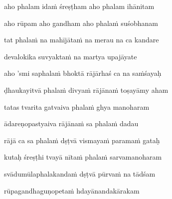 aho phalam idaṁ śreṣṭham aho phalam ihānitam\thinspace{\dandab} \dontdisplaylinenum

aho rūpam aho gandham aho phalaṁ suśobhanam \veg\dontdisplaylinenum
{}

tat phalaṁ na mahījātaṁ na merau na ca kandare\thinspace{\dandab} \dontdisplaylinenum

devalokika suvyaktaṁ na martya upajāyate \veg\dontdisplaylinenum
{}

aho 'smi saphalaṁ bhoktā rājārhaś ca na saṁśayaḥ\thinspace{\dandab} \dontdisplaylinenum

ḍhaukayitvā phalaṁ divyaṁ rājānaṁ toṣayāmy aham \veg\dontdisplaylinenum
{}

tatas tvarita gatvaiva phalaṁ ghya manoharam\thinspace{\dandab} \dontdisplaylinenum

ādareṇopastyaiva rājānaṁ sa phalaṁ dadau \veg\dontdisplaylinenum
{}

rājā ca sa phalaṁ dṣṭvā vismayaṁ paramaṁ gataḥ\thinspace{\dandab} \dontdisplaylinenum

kutaḥ śreṣṭhi tvayā nītaṁ phalaṁ sarvamanoharam \veg\dontdisplaylinenum
{}

svādumūlaphalakandaṁ dṣṭvā pūrvaṁ na tādśam\thinspace{\dandab} \dontdisplaylinenum

rūpagandhaguṇopetaṁ hdayānandakārakam \veg\dontdisplaylinenum
{}

